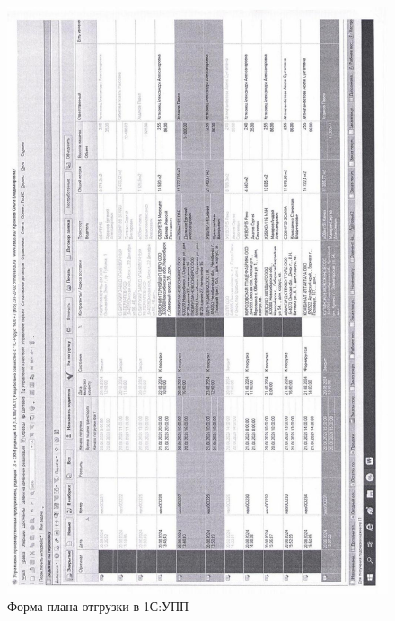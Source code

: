 \begin{figure}
\begin{center}
 \includegraphics[width=\linewidth, height=0.94\textheight, keepaspectratio]{Pics/d16.jpg}
\end{center}
 \caption{Форма плана отгрузки в 1С:УПП}
 \label{pic:d16}
\end{figure}